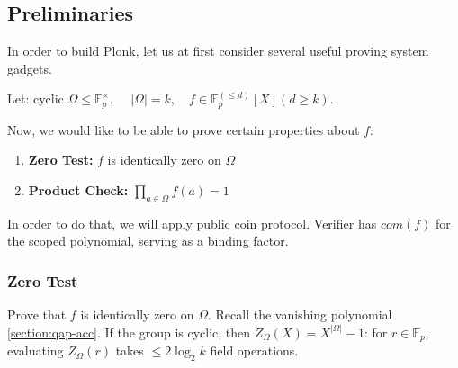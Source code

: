 \documentclass[../lecture-notes.tex]{subfiles}
\begin{document}
\subsection{Preliminaries}
In order to build Plonk, let us at first consider several useful proving system gadgets.

Let: cyclic $\Omega \leq \mathbb{F}_p^\times, \quad \ |\Omega| = k , \quad f \in \mathbb{F}_p^{(\leq d)}[X] (d \geq k)$.

Now, we would like to be able to prove certain properties about $f$:

\begin{enumerate}
    \item \textbf{Zero Test:} $f$ is identically zero on $\Omega$
    \item \textbf{Product Check:} $\prod_{a \in \Omega} f(a) = 1$
\end{enumerate}

In order to do that, we will apply public coin protocol. Verifier has $com(f)$ for the scoped polynomial, serving as a binding factor.

\subsubsection{Zero Test}

Prove that $f$ is identically zero on $\Omega$. Recall the vanishing polynomial \ref{section:qap-acc}. 
If the group is cyclic, then $Z_{\Omega}(X) = X^{|\Omega|} - 1$: for $r \in \mathbb{F}_p$, evaluating $Z_\Omega(r)$ takes $\leq 2 \log_2 k$ field operations.
\end{document}
